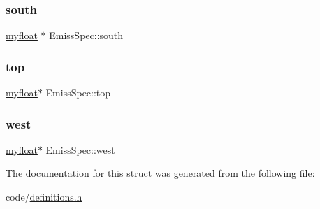 \subsubsection{\texorpdfstring{south}{south}}
{\footnotesize\ttfamily \hyperlink{param_8h_a5f097c9f3873af7be7fc156e6a06ca5e}{myfloat} $\ast$ Emiss\+Spec\+::south}

\mbox{\label{structEmissSpec_ad6bc45022c933e9db72def44965ebd1d}} 
\subsubsection{\texorpdfstring{top}{top}}
{\footnotesize\ttfamily \hyperlink{param_8h_a5f097c9f3873af7be7fc156e6a06ca5e}{myfloat}$\ast$ Emiss\+Spec\+::top}

\mbox{\label{structEmissSpec_a0d3b180d082837fce1082166f5043a9f}} 
\subsubsection{\texorpdfstring{west}{west}}
{\footnotesize\ttfamily \hyperlink{param_8h_a5f097c9f3873af7be7fc156e6a06ca5e}{myfloat}$\ast$ Emiss\+Spec\+::west}



The documentation for this struct was generated from the following file\+:\begin{DoxyCompactItemize}
\item 
code/\hyperlink{definitions_8h}{definitions.\+h}\end{DoxyCompactItemize}
